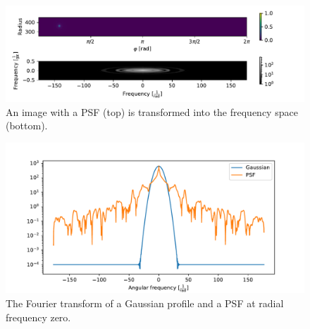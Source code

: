 \begin{figure}[H]
	\centering
		\includegraphics[width=1.1\textwidth]{pics/PSF_fourier.pdf}
		\caption{An image with a PSF (top) is transformed into the frequency space (bottom).}
		\label{fig:PSF_fourier}
\end{figure}
\begin{figure}[H]
	\centering
		\includegraphics[width=1.0\textwidth]{pics/PSF_cut_fourier.pdf}
		\caption{The Fourier transform of a Gaussian profile and a PSF at radial frequency zero. }
		\label{fig:PSF_cut_fourier}
\end{figure}

